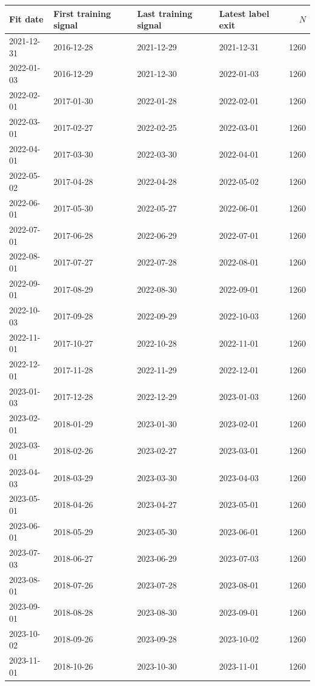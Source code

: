 \begin{tabular}{llllr}
\toprule
Fit date & First training signal & Last training signal & Latest label exit & $N$ \\
\midrule
2021-12-31 & 2016-12-28 & 2021-12-29 & 2021-12-31 & 1260 \\
2022-01-03 & 2016-12-29 & 2021-12-30 & 2022-01-03 & 1260 \\
2022-02-01 & 2017-01-30 & 2022-01-28 & 2022-02-01 & 1260 \\
2022-03-01 & 2017-02-27 & 2022-02-25 & 2022-03-01 & 1260 \\
2022-04-01 & 2017-03-30 & 2022-03-30 & 2022-04-01 & 1260 \\
2022-05-02 & 2017-04-28 & 2022-04-28 & 2022-05-02 & 1260 \\
2022-06-01 & 2017-05-30 & 2022-05-27 & 2022-06-01 & 1260 \\
2022-07-01 & 2017-06-28 & 2022-06-29 & 2022-07-01 & 1260 \\
2022-08-01 & 2017-07-27 & 2022-07-28 & 2022-08-01 & 1260 \\
2022-09-01 & 2017-08-29 & 2022-08-30 & 2022-09-01 & 1260 \\
2022-10-03 & 2017-09-28 & 2022-09-29 & 2022-10-03 & 1260 \\
2022-11-01 & 2017-10-27 & 2022-10-28 & 2022-11-01 & 1260 \\
2022-12-01 & 2017-11-28 & 2022-11-29 & 2022-12-01 & 1260 \\
2023-01-03 & 2017-12-28 & 2022-12-29 & 2023-01-03 & 1260 \\
2023-02-01 & 2018-01-29 & 2023-01-30 & 2023-02-01 & 1260 \\
2023-03-01 & 2018-02-26 & 2023-02-27 & 2023-03-01 & 1260 \\
2023-04-03 & 2018-03-29 & 2023-03-30 & 2023-04-03 & 1260 \\
2023-05-01 & 2018-04-26 & 2023-04-27 & 2023-05-01 & 1260 \\
2023-06-01 & 2018-05-29 & 2023-05-30 & 2023-06-01 & 1260 \\
2023-07-03 & 2018-06-27 & 2023-06-29 & 2023-07-03 & 1260 \\
2023-08-01 & 2018-07-26 & 2023-07-28 & 2023-08-01 & 1260 \\
2023-09-01 & 2018-08-28 & 2023-08-30 & 2023-09-01 & 1260 \\
2023-10-02 & 2018-09-26 & 2023-09-28 & 2023-10-02 & 1260 \\
2023-11-01 & 2018-10-26 & 2023-10-30 & 2023-11-01 & 1260 \\

\end{tabular}
